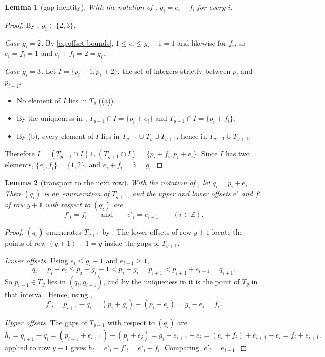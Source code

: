 \documentclass[11pt]{article}
\theoremstyle{plain}
\newtheorem{lemma}[lemma]{Lemma}
\theoremstyle{definition}
\theoremstyle{remark}
\newcommand{\Z}{\mathbb{Z}}
\begin{document}
\begin{lemma}[gap identity]\label{lem:gap-identity}
With the notation of , $g_i = e_i + f_i$ for every $i$.
\end{lemma}

\begin{proof}
By , $g_i \in \{2, 3\}$.

\emph{Case $g_i = 2$.} By \eqref{eq:offset-bounds}, $1 \le e_i \le g_i - 1 = 1$ and likewise
for $f_i$, so $e_i = f_i = 1$ and $e_i + f_i = 2 = g_i$.

\emph{Case $g_i = 3$.} Let $I = \{p_i + 1, p_i + 2\}$, the set of integers strictly between
$p_i$ and $p_{i+1}$.
\begin{itemize}
  \item No element of $I$ lies in $T_y$ ((a)).
  \item By the uniqueness in , $T_{y+1} \cap I = \{p_i + e_i\}$ and
        $T_{y-1} \cap I = \{p_i + f_i\}$.
  \item By (b), every element of $I$ lies in
        $T_{y-1} \cup T_y \cup T_{y+1}$, hence in $T_{y-1} \cup T_{y+1}$.
\end{itemize}
Therefore $I = (T_{y-1} \cap I) \cup (T_{y+1} \cap I) = \{p_i + f_i, p_i + e_i\}$. Since $I$
has two elements, $\{e_i, f_i\} = \{1, 2\}$, and $e_i + f_i = 3 = g_i$.
\end{proof}

\begin{lemma}[transport to the next row]\label{lem:transport}
With the notation of , let $q_i = p_i + e_i$. Then $(q_i)$ is an enumeration
of $T_{y+1}$, and the upper and lower offsets $e'$ and $f'$ of row $y+1$ with respect to
$(q_i)$ are
\[
f'_i = f_i \qquad\text{and}\qquad e'_i = e_{i+1} \qquad (i \in \Z).
\]
\end{lemma}

\begin{proof}
$(q_i)$ enumerates $T_{y+1}$ by . The lower offsets of row $y+1$ locate the
points of row $(y+1) - 1 = y$ inside the gaps of $T_{y+1}$.

\emph{Lower offsets.} Using $e_i \le g_i - 1$ and $e_{i+1} \ge 1$,
\[
q_i = p_i + e_i \le p_i + g_i - 1 < p_i + g_i = p_{i+1} < p_{i+1} + e_{i+1} = q_{i+1}.
\]
So $p_{i+1} \in T_y$ lies in $(q_i, q_{i+1})$, and by the uniqueness in
 it is the point of $T_y$ in that interval. Hence, using
,
\[
f'_i = p_{i+1} - q_i = (p_i + g_i) - (p_i + e_i) = g_i - e_i = f_i .
\]

\emph{Upper offsets.} The gaps of $T_{y+1}$ with respect to $(q_i)$ are
\[
h_i = q_{i+1} - q_i = (p_{i+1} + e_{i+1}) - (p_i + e_i) = g_i + e_{i+1} - e_i
= (e_i + f_i) + e_{i+1} - e_i = f_i + e_{i+1}.
\]
 applied to row $y+1$ gives $h_i = e'_i + f'_i = e'_i + f_i$.
Comparing, $e'_i = e_{i+1}$.
\end{proof}
\end{document}
